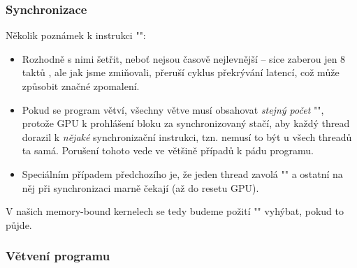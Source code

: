         \subsubsection{Synchronizace}

        Několik poznámek k instrukci \Vr"":
        \begin{itemize}
          \item Rozhodně s nimi šetřit, neboť nejsou časově nejlevnější -- sice zaberou jen 8 taktů \cite{CUDA programming g.}, ale jak jsme zmiňovali, přeruší cyklus překrývání latencí, což může způsobit značné zpomalení.
          \item Pokud se program větví, všechny větve musí obsahovat \emph{stejný počet} \Vr"", protože GPU k prohlášení bloku za synchronizovaný stačí, aby každý thread dorazil k \emph{nějaké} synchronizační instrukci, tzn. nemusí to být u všech threadů ta samá. Porušení tohoto vede ve většině případů k pádu programu.
          \item Speciálním případem předchozího je, že jeden thread zavolá \Vr"" a ostatní na něj při synchronizaci marně čekají (až do resetu GPU).
        \end{itemize}
        V našich memory-bound kernelech se tedy budeme požití \Vr"" vyhýbat, pokud to půjde.

        \subsubsection{Větvení programu}\label{větvení}

